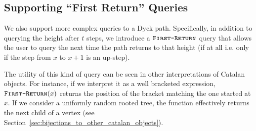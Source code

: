\subsection{Supporting ``First Return'' Queries}%
\label{sec:supporting_first_return_queries}

We also support more complex queries to a Dyck path.
Specifically, in addition to querying the height after $t$ steps,
we introduce a $\texttt{\textsc{First-Return}}$ query that allows the user to query the next time the path returns to that height
(if at all i.e. only if the step from $x$ to $x+1$ is an up-step).

The utility of this kind of query can be seen in other interpretations of Catalan objects.
For instance, if we interpret it as a well bracketed expression,
$\texttt{\textsc{First-Return}}(x)$ returns the position of the bracket matching the one started at $x$.
If we consider a uniformly random rooted tree,
the function effectively returns the next child of a vertex (see Section~\ref{sec:bijections_to_other_catalan_objects}).




